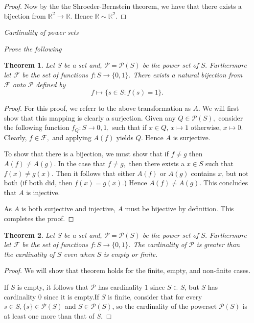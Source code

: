 \documentclass[letter]{article}
\newtheorem{theorem}{Theorem}
\newenvironment{menumerate}{%
  \edef\backupindent{\the\parindent}%
  \enumerate%
  \setlength{\parindent}{\backupindent}%
}{\endenumerate}
\begin{document}
\begin{menumerate}
\begin{proof}
		 		Now by the the Shroeder-Bernstein theorem, we have that there exists a bijection from $\mathbb{R}^2 \to \mathbb{R}.$ Hence $\mathbb{R} \sim \mathbb{R}^2.$
		 	\end{proof}
 		\item \textit{Cardinality of power sets }
	 		\begin{menumerate}
				\item \textit{Prove the following}
				\begin{theorem}
					Let $S$ be a set and, $\mathcal{P} = \mathcal{P}(S)$ be the power set of $S.$ Furthermore let $\mathcal{F}$ be the set of functions $f: S \to \{0,1\}$. There exists a natural bijection from $\mathcal{F}$ onto $\mathcal{P}$ defined by $$f \mapsto \{s \in S:f(s) = 1\}.$$
				\end{theorem}

				\begin{proof}
					For this proof, we referr to the above transformation as $A.$ We will first show that this mapping is clearly a surjection. Given any $Q \in \mathcal{P}(S),$ consider the following function $f_Q:S \to {0,1},$ such that if $x \in Q$, $x\mapsto 1$ otherwise, $x \mapsto 0$. Clearly, $f \in \mathcal{F},$ and applying $A(f)$ yields $Q.$ Hence $A$ is surjective.

					To show that there is a bijection, we must show that if $f\neq g$ then $A(f) \neq A(g).$ In the case that $f \neq g,$ then there exists a $x \in S$ such that $f(x) \neq g(x).$ Then it follows that either $A(f)$ or $A(g)$ contains $x$, but not both (if both did, then $f(x) = g(x).$) Hence $A(f) \neq A(g).$ This concludes that $A$ is injective.

					As $A$ is both surjective and injective, $A$ must be bijective by definition. This completes the proof.
				\end{proof}
				


				\begin{theorem}
				Let $S$ be a set and, $\mathcal{P} = \mathcal{P}(S)$ be the power set of $S.$ Furthermore let $\mathcal{F}$ be the set of functions $f: S \to \{0,1\}$. The cardinality of $\mathcal{P}$ is greater than the cardinality of $S$ even when $S$ is empty or finite.
				\end{theorem}

				\begin{proof}
				We will show that theorem holds for the finite, empty, and non-finite cases.

				If $S$ is empty, it follows that $\mathcal{P}$ has cardinality $1$ since $S \subset S$, but $S$ has cardinality $0$ since it is empty.If $S$ is finite, consider that for every $s \in S, \{s\} \in \mathcal{P}(S) $ and $S \in \mathcal{P}(S)$, so the cardinality of the powerset $\mathcal{P}(S)$ is at least one more than that of $S$. 


\end{proof}
\end{menumerate}
\end{menumerate}
\end{document}
